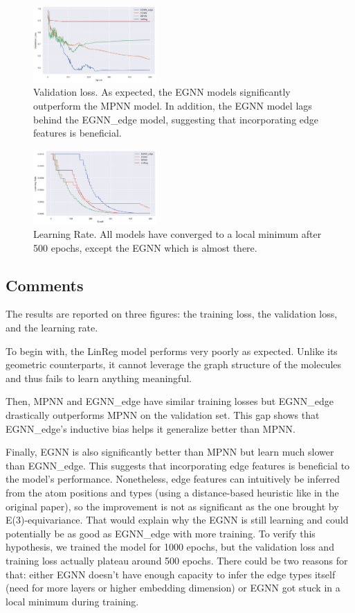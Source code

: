 \documentclass[sigconf]{acmart}
\begin{document}
\begin{figure}
    \centering
    \includegraphics[width=0.42\textwidth]{figures/validation_loss.png}
    \caption{Validation loss. As expected, the EGNN models significantly outperform the MPNN model. In addition, the EGNN model lags behind the EGNN\_edge model, suggesting that incorporating edge features is beneficial.}
    \label{fig:validation-loss}
\end{figure}

\begin{figure}
    \centering
    \includegraphics[width=0.42\textwidth]{figures/learning_rate.png}
    \caption{Learning Rate. All models have converged to a local minimum after 500 epochs, except the EGNN which is almost there.}
    \label{fig:learning-rate}
\end{figure}

\subsection{Comments}
The results are reported on three figures: the training loss, the validation loss, and the learning rate.

To begin with, the LinReg model performs very poorly as expected. Unlike its geometric counterparts, it cannot leverage the graph structure of the molecules and thus fails to learn anything meaningful.

Then, MPNN and EGNN\_edge have similar training losses but EGNN\_edge drastically outperforms MPNN on the validation set. This gap shows that EGNN\_edge's inductive bias helps it generalize better than MPNN.

Finally, EGNN is also significantly better than MPNN but learn much slower than EGNN\_edge. This suggests that incorporating edge features is beneficial to the model's performance.
Nonetheless, edge features can intuitively be inferred from the atom positions and types (using a distance-based heuristic like in the original paper), so the improvement is not as significant as the one brought by E(3)-equivariance.
That would explain why the EGNN is still learning and could potentially be as good as EGNN\_edge with more training. To verify this hypothesis, we trained the model for 1000 epochs, but the validation loss and training loss actually plateau around 500 epochs. There could be two reasons for that: either EGNN doesn't have enough capacity to infer the edge types itself (need for more layers or higher embedding dimension) or EGNN got stuck in a local minimum during training.




\end{document}

